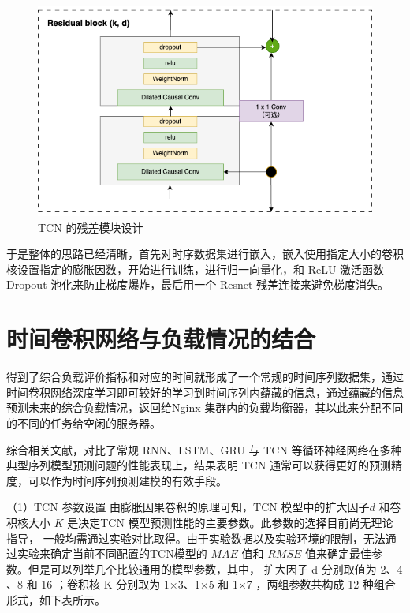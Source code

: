 \begin{figure}[htbp]
  \centering
  \includegraphics[width=\textwidth]{figures/resiual_tcn.drawio.png}
  \caption{TCN 的残差模块设计}
  \label{residual_tcn}
\end{figure}

于是整体的思路已经清晰，首先对时序数据集进行嵌入，嵌入使用指定大小的卷积核设置指定的膨胀因数，开始进行训练，进行归一向量化，和 ReLU 激活函数 Dropout 池化来防止梯度爆炸，最后用一个 Resnet 残差连接来避免梯度消失。

\section{时间卷积网络与负载情况的结合}
得到了综合负载评价指标和对应的时间就形成了一个常规的时间序列数据集，通过时间卷积网络深度学习即可较好的学习到时间序列内蕴藏的信息，通过蕴藏的信息预测未来的综合负载情况，返回给Nginx 集群内的负载均衡器，其以此来分配不同的不同的任务给空闲的服务器。

综合相关文献，对比了常规 RNN、LSTM、GRU 与 TCN 等循环神经网络在多种典型序列模型预测问题的性能表现上，结果表明 TCN 通常可以获得更好的预测精度，可以作为时间序列预测建模的有效手段\cite{bai2018empirical}\cite{赵洋2022基于时间卷积网络的短期电力负荷预测}。

（1）TCN 参数设置
由膨胀因果卷积的原理可知，TCN 模型中的扩大因子$d$ 和卷积核大小 $K$ 是决定TCN 模型预测性能的主要参数。此参数的选择目前尚无理论指导， 一般均需通过实验对比取得\cite{hewage2020temporal}。由于实验数据以及实验环境的限制，无法通过实验来确定当前不同配置的TCN模型的 $MAE$ 值和 $RMSE$ 值来确定最佳参数。但是可以列举几个比较通用的模型参数，其中， 扩大因子 d 分别取值为 2、4 、8 和 16 ；卷积核 K 分别取为 1×3、1×5 和 1×7 ，两组参数共构成 12 种组合形式，如下表所示。

